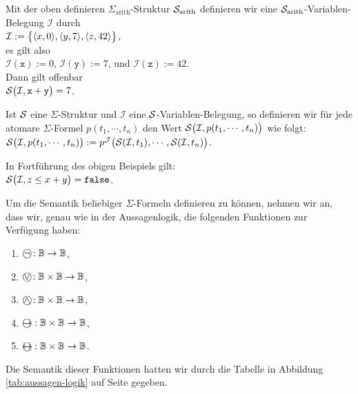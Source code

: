 \example
Mit der oben definieren $\Sigma_\mathrm{arith}$-Struktur
$\mathcal{S}_{\mathrm{arith}}$ definieren wir eine
$\mathcal{S}_{\mathrm{arith}}$-Variablen-Belegung $\mathcal{I}$ durch
\\[0.2cm]
\hspace*{1.3cm} $\mathcal{I} := \bigl\{ \pair(x,0), \pair(y,7), \pair(z,42)\bigr\}$,
\\[0.2cm]
es gilt also
\\[0.2cm]
\hspace*{1.3cm} $\mathcal{I}(\mathtt{x}) := 0$, \quad $\mathcal{I}(\mathtt{y}) := 7$,
\quad und \quad $\mathcal{I}(\mathtt{z}) := 42$.
\\[0.2cm]
Dann gilt offenbar \\[0.2cm]
\hspace*{1.3cm}  $\mathcal{S}\bigl(\mathcal{I}, \mathtt{x} + \mathtt{y} \bigr) = 7$.

\begin{Definition}
    Ist $\mathcal{S}$ eine $\Sigma$-Struktur und $\mathcal{I}$ eine $\mathcal{S}$-Variablen-Belegung,
    so definieren wir f\"{u}r jede atomare $\Sigma$-Formel 
    $p(t_1, \cdots, t_n)$ den Wert $\mathcal{S}\bigl(\mathcal{I}, p(t_1, \cdots, t_n) \bigr)$ wie folgt: \\[0.2cm]
    \hspace*{1.3cm} $\mathcal{S}\bigl(\mathcal{I}, p(t_1,\cdots,t_n)\bigr) := 
                     p^\mathcal{J}\bigl( \mathcal{S}(\mathcal{I}, t_1), \cdots, \mathcal{S}(\mathcal{I}, t_n) \bigr)$.
                     \eox
\end{Definition}

\example
In Fortf\"{u}hrung des obigen Beispiels gilt: \\[0.2cm]
\hspace*{1.3cm}  $\mathcal{S}\bigl(\mathcal{I},z \leq x + y \bigr) = \mathtt{false}$.
\eox

Um die Semantik beliebiger $\Sigma$-Formeln definieren zu k\"{o}nnen, nehmen wir an, dass wir,
genau wie in der Aussagenlogik, die folgenden Funktionen zur Verf\"{u}gung haben:
\begin{enumerate}
\item $\circneg: \mathbb{B} \rightarrow \mathbb{B}$,
\item $\circvee: \mathbb{B} \times \mathbb{B} \rightarrow \mathbb{B}$,
\item $\circwedge: \mathbb{B} \times \mathbb{B} \rightarrow \mathbb{B}$,
\item $\circright: \mathbb{B} \times \mathbb{B} \rightarrow \mathbb{B}$,
\item $\circleftright: \mathbb{B} \times \mathbb{B} \rightarrow \mathbb{B}$.
\end{enumerate}
Die Semantik dieser Funktionen hatten wir durch die Tabelle in Abbildung
\ref{tab:aussagen-logik} auf Seite \pageref{tab:aussagen-logik} gegeben. 

